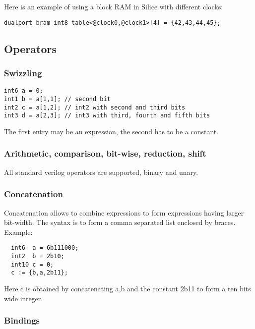 \documentclass[a4]{article}
\newcommand\silice{Silice}
\begin{document}
Here is an example of using a block RAM in \silice{} with different clocks:

\begin{verbatim}
dualport_bram int8 table<@clock0,@clock1>[4] = {42,43,44,45};
\end{verbatim}

\subsection{Operators}

\subsubsection{Swizzling}

\begin{verbatim}
int6 a = 0;
int1 b = a[1,1]; // second bit
int2 c = a[1,2]; // int2 with second and third bits
int3 d = a[2,3]; // int3 with third, fourth and fifth bits
\end{verbatim}

The first entry may be an expression, the second has to be a constant.

\subsubsection{Arithmetic, comparison, bit-wise, reduction, shift}

All standard verilog operators are supported, binary and unary.

\subsubsection{Concatenation}

Concatenation allows to combine expressions to form expressions having larger bit-width.
The syntax is to form a comma separated list enclosed by braces.  Example:
\begin{verbatim}
  int6  a = 6b111000;
  int2  b = 2b10;
  int10 c = 0;
  c := {b,a,2b11};
\end{verbatim}

Here c is obtained by concatenating a,b and the constant 2b11 to form a ten bits wide integer.

\subsubsection{Bindings}
\label{sec:bindings}
\end{document}
